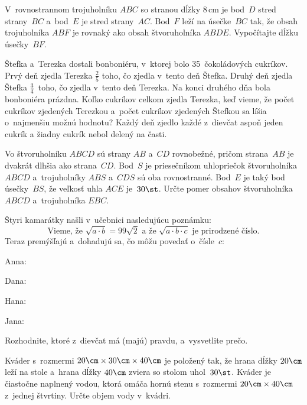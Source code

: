 {%
V~rovnostrannom trojuholníku $ABC$ so stranou dĺžky 8\,cm je bod~$D$ stred strany~$BC$ a~bod~$E$ je stred strany~$AC$. Bod~$F$ leží na úsečke~$BC$ tak, že obsah trojuholníka $ABF$ je rovnaký ako obsah štvoruholníka $ABDE$. Vypočítajte dĺžku úsečky~$BF$.}

{%
Štefka a~Terezka dostali bonboniéru, v~ktorej bolo 35~čokoládových cukríkov. Prvý deň zjedla Terezka $\frac25$ toho, čo zjedla v~tento deň Štefka.
Druhý deň zjedla Štefka $\frac34$~toho, čo zjedla v~tento deň Terezka. Na konci druhého dňa bola bonboniéra prázdna. Koľko cukríkov celkom zjedla Terezka, keď vieme,
že počet cukríkov zjedených Terezkou a~počet cukríkov zjedených Štefkou sa líšia o~najmenšiu možnú hodnotu?
Každý deň zjedlo každé z~dievčat aspoň jeden cukrík a žiadny cukrík nebol delený na časti.
}

{%
Vo štvoruholníku $ABCD$ sú strany $AB$ a~$CD$ rovnobežné, pričom strana~$AB$ je dvakrát dlhšia ako strana~$CD$.
Bod~$S$ je priesečníkom uhlopriečok štvoruholníka $ABCD$ a~trojuholníky $ABS$ a~$CDS$ sú oba rovnostranné.
Bod~$E$ je taký bod úsečky~$BS$, že veľkosť uhla $ACE$ je~$30\st$.
Určte pomer obsahov štvoruholníka $ABCD$ a~trojuholníka $EBC$.}

{%
Štyri kamarátky našli v~učebnici nasledujúcu poznámku:
$$
\text{Vieme, že $\sqrt{a\cdot b}=99\sqrt2$ a~že $\sqrt{a\cdot b\cdot c}$ je prirodzené číslo.}
$$
Teraz premýšľajú a~dohadujú sa, čo môžu povedať o~čísle~$c$:
\item Anna: 
\item Dana: 
\item Hana: 
\item Jana: 

Rozhodnite, ktoré z~dievčat má (majú) pravdu, a~vysvetlite prečo.}

{%
Kváder s~rozmermi $20\cm\times 30\cm\times 40\cm$ je položený tak, že hrana dĺžky $20\cm$ leží na stole a~hrana dĺžky $40\cm$ zviera so stolom uhol~$30\st$.
Kváder je čiastočne naplnený vodou, ktorá omáča hornú stenu s~rozmermi $20\cm\times 40\cm$ z~jednej štvrtiny.
Určte objem vody v~kvádri.
\ifobrazkyvedla\else{}\fi%
}

